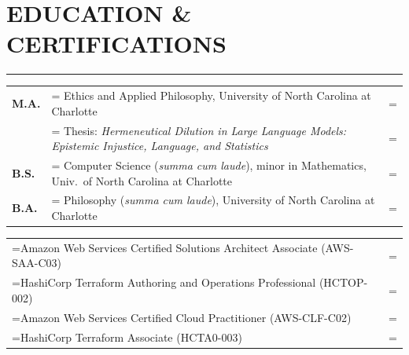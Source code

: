 \documentclass{article}
\begin{document}
\section*{\normalsize{EDUCATION \& CERTIFICATIONS}}
\vspace{-1.8em}
\noindent\rule{\textwidth}{.5pt}
\renewcommand{\arraystretch}{1.35}

\vspace{-.75em}
\hspace{-1em}
\begin{tabularx}{\textwidth}{
     >{\raggedright\arraybackslash}p{2.5em}
     >{\raggedright\arraybackslash\hsize=1.97\hsize\linewidth=\hsize}X
     >{\raggedleft\arraybackslash\hsize=0.03\hsize\linewidth=\hsize}X }
    \textbf{M.A.} & Ethics and Applied Philosophy, University of North Carolina at Charlotte \\
     & Thesis: \textit{Hermeneutical Dilution in Large Language Models: Epistemic Injustice, Language, and Statistics} & \\
    \textbf{B.S.} & Computer Science (\textit{summa cum laude}), minor in Mathematics, Univ.\ of North Carolina at Charlotte & \\
    \textbf{B.A.} & Philosophy (\textit{summa cum laude}), University of North Carolina at Charlotte &
\end{tabularx}

\vspace*{1em}

\hspace{-1em}
\begin{tabularx}{\textwidth}{
     >{\raggedright\arraybackslash\hsize=1.97\hsize\linewidth=\hsize}X
     >{\raggedleft\arraybackslash\hsize=0.03\hsize\linewidth=\hsize}X }
    Amazon Web Services Certified Solutions Architect Associate (AWS-SAA-C03) &\\
    HashiCorp Terraform Authoring and Operations Professional (HCTOP-002) &\\
    Amazon Web Services Certified Cloud Practitioner (AWS-CLF-C02) &\\
    HashiCorp Terraform Associate (HCTA0-003) &\\
 \end{tabularx}


\end{document}
